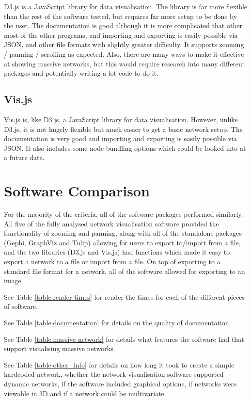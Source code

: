 \documentclass[../dissertation.tex]{subfiles}
\begin{document}
D3.js is a JavaScript library for data visualisation. The library is far more flexible than the rest of the software tested, but requires far more setup to be done by the user. The documentation is good although it is more complicated that other most of the other programs, and importing and exporting is easily possible via JSON, and other file formats with slightly greater difficulty. It supports zooming / panning / scrolling as expected. Also, there are many ways to make it effective at showing massive networks, but this would require research into many different packages and potentially writing a lot code to do it.

\subsection{Vis.js}

Vis.js is, like D3.js, a JavaScript library for data visualisation. However, unlike D3.js, it is not hugely flexible but much easier to get a basic network setup. The documentation is very good and importing and exporting is easily possible via JSON. It also includes some node bundling options which could be looked into at a future date.

\section{Software Comparison}

For the majority of the criteria, all of the software packages performed similarly. All five of the fully analysed network visualisation software provided the functionality of zooming and panning, along with all of the standalone packages (Gephi, GraphViz and Tulip) allowing for users to export to/import from a file, and the two libraries (D3.js and Vis.js) had functions which made it easy to export a network to a file or import from a file. On top of exporting to a standard file format for a network, all of the software allowed for exporting to an image.

See Table \ref{table:render-times} for render the times for each of the different pieces of software.

See Table \ref{table:documentation} for details on the quality of documentation.

See Table \ref{table:massive-network} for details what features the software had that support visualising massive networks.

See Table \ref{table:other_info} for details on how long it took to create a simple hardcoded network, whether the network visualisation software supported dynamic networks, if the software included graphical options, if networks were viewable in 3D and if a network could be multivariate.
\end{document}
